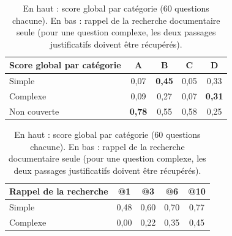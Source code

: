 \documentclass[11pt,a4paper]{article}
\begin{document}
\begin{table}[H]
\centering\small
\begin{tabular}{l c c c c}
\toprule
\textbf{Score global par catégorie} & \textbf{A} & \textbf{B} & \textbf{C} & \textbf{D} \\
\midrule
Simple       & 0,07 & \textbf{0,45} & 0,05 & 0,33 \\
Complexe     & 0,09 & 0,27 & 0,07 & \textbf{0,31} \\
Non couverte & \textbf{0,78} & 0,55 & 0,58 & 0,25 \\
\bottomrule
\end{tabular}
\hspace{1em}
\begin{tabular}{l c c c c}
\toprule
\textbf{Rappel de la recherche} & \textbf{@1} & \textbf{@3} & \textbf{@6} & \textbf{@10} \\
\midrule
Simple       & 0,48 & 0,60 & 0,70 & 0,77 \\
Complexe     & 0,00 & 0,22 & 0,35 & 0,45 \\
\bottomrule
\end{tabular}
\caption{En haut : score global par catégorie (60 questions chacune). En bas : rappel de la
recherche documentaire seule (pour une question complexe, les deux passages justificatifs doivent
être récupérés).}
\label{tab:pilote-cat}
\end{table}
\end{document}
